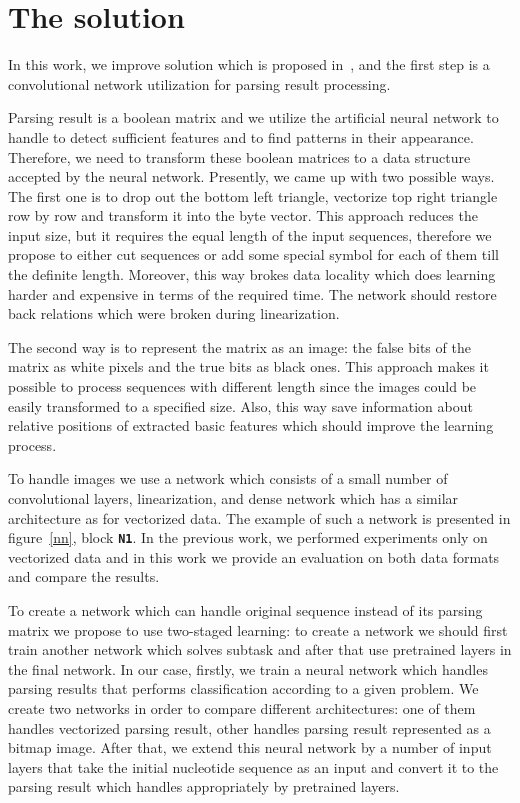 \documentclass[12pt,a4paper]{cibb}
\begin{document}
\section{\bf The solution}

In this work, we improve solution which is proposed in~\cite{grigorevcomposition}, and the first step is a convolutional network utilization for parsing result processing.

Parsing result is a boolean matrix and we utilize the artificial neural network to handle to detect sufficient features and to find patterns in their appearance.
Therefore, we need to transform these boolean matrices to a data structure accepted by the neural network.
Presently, we came up with two possible ways.
The first one is to drop out the bottom left triangle, vectorize top right triangle row by row and transform it into the byte vector.
This approach reduces the input size, but it requires the equal length of the input sequences, therefore we propose to either cut sequences or add some special symbol for each of them till the definite length.
Moreover, this way brokes data locality which does learning harder and expensive in terms of the required time.
The network should restore back relations which were broken during linearization.

The second way is to represent the matrix as an image: the false bits of the matrix as white pixels and the true bits as black ones.
This approach makes it possible to process sequences with different length since the images could be easily transformed to a specified size.
Also, this way save information about relative positions of extracted basic features which should improve the learning process.

To handle images we use a network which consists of a small number of convolutional layers, linearization, and dense network which has a similar architecture as for vectorized data.
The example of such a network is presented in figure~\ref{nn}, block \textbf{\texttt{N1}}.
In the previous work, we performed experiments only on vectorized data and in this work we provide an evaluation on both data formats and compare the results.

To create a network which can handle original sequence instead of its parsing matrix we propose to use two-staged learning: to create a network we should first train another network which solves subtask and after that use pretrained layers in the final network.
In our case, firstly, we train a neural network which handles parsing results that performs classification according to a given problem.
We create two networks in order to compare different architectures: one of them handles vectorized parsing result, other handles parsing result represented as a bitmap image.
After that, we extend this neural network by a number of input layers that take the initial nucleotide sequence as an input and convert it to the parsing result which handles appropriately by pretrained layers.
\end{document}
